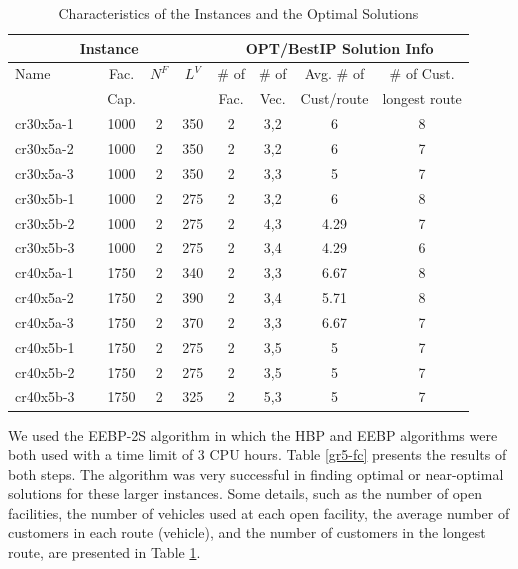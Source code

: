 \begin{table}[ht]
\centering
\caption{Characteristics of the Instances and the Optimal Solutions}\label{soln-tb}
\begin {tabular}[t]{|l|c|c|c|c|c|c|c|}  
\hline
 \multicolumn{4}{|c|}{Instance} & \multicolumn{4}{|c|}{OPT/BestIP Solution Info} \\\hline
Name & Fac.& $N^F$ & $L^V$ &  \# of & \# of & Avg. \# of & \# of Cust. \\
\mbox{} & \mbox{Cap.} & \mbox{} & \mbox{} & Fac. & Vec. & Cust/route & longest route \\\hline
cr30x5a-1  \ \	&	1000	&	2	&	350	&	2	&	3,2	&	6	&	8	\\
cr30x5a-2  \ \	&	1000	&	2	&	350	&	2	&	3,2	&	6	&	7	\\
cr30x5a-3  \ \	&	1000	&	2	&	350	&	2	&	3,3	&	5	&	7	\\
cr30x5b-1  \ \	&	1000	&	2	&	275	&	2	&	3,2	&	6	&	8	\\
cr30x5b-2  \ \	&	1000	&	2	&	275	&	2	&	4,3	&	4.29	&	7	\\
cr30x5b-3  \ \	&	1000	&	2	&	275	&	2	&	3,4	&	4.29	&	6	\\
cr40x5a-1  \ \	&	1750	&	2	&	340	&	2	&	3,3	&	6.67	&	8	\\
cr40x5a-2  \ \	&	1750	&	2	&	390	&	2	&	3,4	&	5.71	&	8	\\
cr40x5a-3  \ \	&	1750	&	2	&	370	&	2	&	3,3	&	6.67	&	7	\\
cr40x5b-1  \ \	&	1750	&	2	&	275	&	2	&	3,5	&	5	&	7	\\
cr40x5b-2 \ \ 	&	1750	&	2	&	275	&	2	&	3,5	&	5	&	7	\\
cr40x5b-3  \ \	&	1750	&	2	&	325	&	2	&	5,3	&	5	&	7	\\
\hline
\end{tabular}
\end{table} 
We used the EEBP-2S algorithm in which the HBP and EEBP algorithms
were both used with a time limit of 3 CPU hours. Table \ref{gr5-fc}
presents the results of both steps. The algorithm was very successful
in finding optimal or near-optimal solutions for these larger
instances. 
Some details, such as the number of open facilities, the number of
vehicles used at each open facility, the average number of customers
in each route (vehicle), and the number of customers in the longest
route, are presented in Table
\ref{soln-tb}.
